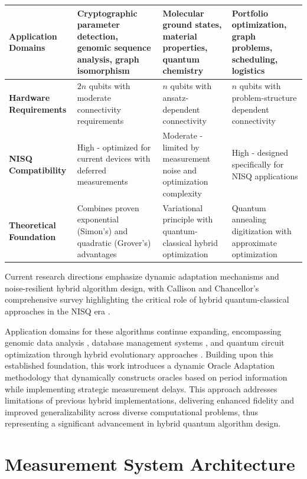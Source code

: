 \documentclass[journal]{IEEEtran}
\begin{document}
\begin{table}[!t]
{\begin{tabular}{|p{2.2cm}|p{4cm}|p{4cm}|p{4.5cm}|}
\hline
\textbf{Application Domains} & Cryptographic parameter detection, genomic sequence analysis, graph isomorphism & Molecular ground states, material properties, quantum chemistry & Portfolio optimization, graph problems, scheduling, logistics \\
\hline
\textbf{Hardware Requirements} & $2n$ qubits with moderate connectivity requirements & $n$ qubits with ansatz-dependent connectivity & $n$ qubits with problem-structure dependent connectivity \\
\hline
\textbf{NISQ Compatibility} & High - optimized for current devices with deferred measurements & Moderate - limited by measurement noise and optimization complexity & High - designed specifically for NISQ applications \\
\hline
\textbf{Theoretical Foundation} & Combines proven exponential (Simon's) and quadratic (Grover's) advantages & Variational principle with quantum-classical hybrid optimization & Quantum annealing digitization with approximate optimization \\
\hline
\end{tabular}
}
\end{table}

Current research directions emphasize dynamic adaptation mechanisms and noise-resilient hybrid algorithm design, with Callison and Chancellor's comprehensive survey highlighting the critical role of hybrid quantum-classical approaches in the NISQ era \cite{robertson2024simonsalgorithmnisqcloud}.

Application domains for these algorithms continue expanding, encompassing genomic data analysis \cite{singh2024independentimplementationquantummachine}, database management systems \cite{yuan2024quantumcomputingdatabasesoverview}, and quantum circuit optimization through hybrid evolutionary approaches \cite{sünkel2025quantumcircuitconstructionoptimization}. Building upon this established foundation, this work introduces a dynamic Oracle Adaptation methodology that dynamically constructs oracles based on period information while implementing strategic measurement delays. This approach addresses limitations of previous hybrid implementations, delivering enhanced fidelity and improved generalizability across diverse computational problems, thus representing a significant advancement in hybrid quantum algorithm design.

\section{Measurement System Architecture}
\end{document}
